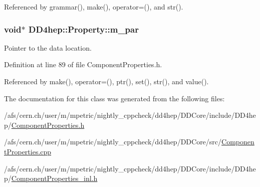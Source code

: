 Referenced by grammar(), make(), operator=(), and str().\hypertarget{class_d_d4hep_1_1_property_a501e760077fb803d75419100c77d3ec4}{
\subsubsection[{m\_\-par}]{\setlength{\rightskip}{0pt plus 5cm}void$\ast$ {\bf DD4hep::Property::m\_\-par}}}
\label{class_d_d4hep_1_1_property_a501e760077fb803d75419100c77d3ec4}


Pointer to the data location. 

Definition at line 89 of file ComponentProperties.h.

Referenced by make(), operator=(), ptr(), set(), str(), and value().

The documentation for this class was generated from the following files:\begin{DoxyCompactItemize}
\item 
/afs/cern.ch/user/m/mpetric/nightly\_\-cppcheck/dd4hep/DDCore/include/DD4hep/\hyperlink{_component_properties_8h}{ComponentProperties.h}\item 
/afs/cern.ch/user/m/mpetric/nightly\_\-cppcheck/dd4hep/DDCore/src/\hyperlink{_component_properties_8cpp}{ComponentProperties.cpp}\item 
/afs/cern.ch/user/m/mpetric/nightly\_\-cppcheck/dd4hep/DDCore/include/DD4hep/\hyperlink{_component_properties__inl_8h}{ComponentProperties\_\-inl.h}\end{DoxyCompactItemize}

